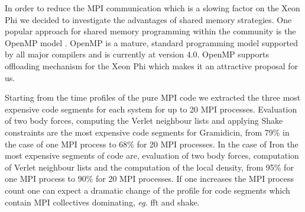 \par{In order to reduce the MPI communication which is a slowing factor on the Xeon Phi we decided to investigate the advantages 
of shared memory strategies. One popular approach for shared memory programming within the community is the OpenMP model 
\cite{openmp2013}. OpenMP is a mature, standard programming model supported by all major compilers and is currently at version 
4.0. OpenMP supports offloading mechanism for the Xeon Phi which makes it an attractive proposal for us.}

\par{Starting from the time profiles of the pure MPI code we extracted the three most expensive code segments for each system for 
up to 20 MPI processes. Evaluation of two body forces, computing the Verlet neighbour lists and applying Shake constraints are the 
most expensive code segments for Gramidicin, from 79\% in the case of one MPI process to 68\% for 20 MPI processes. In the case 
of Iron the most expensive segments of code are, evaluation of two body forces, computation of Verlet neighbour lists and the 
computation of the local density, from 95\% for one MPI process to 90\% for 20 MPI processes. If one increases the MPI process
count one can expect a dramatic change of the profile for code segments which contain MPI collectives dominating, 
\emph{eg.} fft and shake.}

